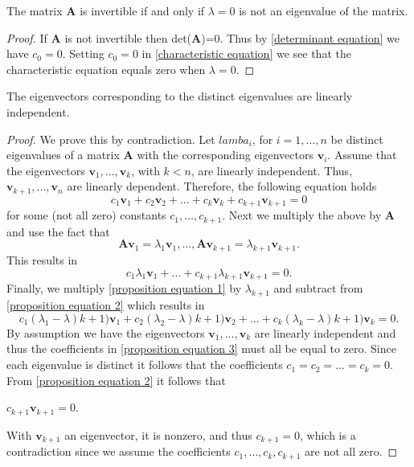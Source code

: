 \documentclass[conference,12pt,onecolumn,compsoc]{IEEEtran}
\begin{document}
\begin{proposition}
The matrix \textbf{A} is invertible if and only if $\lambda=0$ is not an eigenvalue of the matrix.
\end{proposition}
\begin{proof}
If \textbf{A} is not invertible then det(\textbf{A})=0. Thus by \eqref{determinant equation} we have $c_0=0$. Setting $c_0=0$ in \eqref{characteristic equation} we see that the characteristic equation equals zero when $\lambda=0$. 
\end{proof}

\begin{proposition}
The eigenvectors corresponding to the distinct eigenvalues are linearly independent.
\end{proposition}
\begin{proof}
We prove this by contradiction. Let $lamba_i$, for $i=1,...,n$ be distinct eigenvalues of a matrix \textbf{A} with the corresponding eigenvectors $\textbf{v}_i$. Assume that the eigenvectors $\textbf{v}_1, ..., \textbf{v}_k$, with $k<n$, are linearly independent. Thus, $\textbf{v}_{k+1}, ..., \textbf{v}_n$ are linearly dependent. Therefore, the following equation holds
\begin{equation}
c_1\textbf{v}_1+c_2\textbf{v}_2+ ... + c_k\textbf{v}_k + c_{k+1}\textbf{v}_{k+1} = 0
\label{proposition equation 1}
\end{equation}
for some (not all zero) constants $c_1, ..., c_{k+1}$. Next we multiply the above by \textbf{A} and use the fact that
\begin{equation}
\textbf{A}\textbf{v}_1 = \lambda_1\textbf{v}_1, ..., \textbf{A}\textbf{v}_{k+1} = \lambda_{k+1}\textbf{v}_{k+1}.
\nonumber
\end{equation}
This results in
\begin{equation}
c_1\lambda_1\textbf{v}_1 + ... + c_{k+1}\lambda_{k+1}\textbf{v}_{k+1} = 0. 
\label{proposition equation 2}
\end{equation}
Finally, we multiply \eqref{proposition equation 1} by $\lambda_{k+1}$ and subtract from \eqref{proposition equation 2} which results in
\begin{equation}
c_1(\lambda_1 - \lambda){k+1})\textbf{v}_1 + c_2(\lambda_2 - \lambda){k+1})\textbf{v}_2 + ... + c_k(\lambda_k - \lambda){k+1})\textbf{v}_k = 0.
\label{proposition equation 3}
\end{equation}
By assumption we have the eigenvectors $\textbf{v}_1, ..., \textbf{v}_k$ are linearly independent and thus the coefficients in \eqref{proposition equation 3} must all be equal to zero. Since each eigenvalue is distinct it follows that the coefficients $c_1 = c_2 = ... = c_k = 0$. From \eqref{proposition equation 2} it follows that
\begin{center}
$c_{k+1}\textbf{v}_{k+1} = 0$.
\end{center}
With $\textbf{v}_{k+1}$ an eigenvector, it is nonzero, and thus $c_{k+1}=0$, which is a contradiction since we assume the coefficients $c_1, ..., c_k, c_{k+1}$ are not all zero. 
\end{proof}
\end{document}
